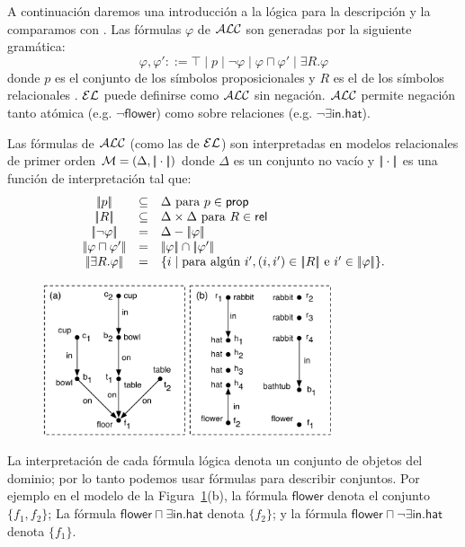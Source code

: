 A continuaci\'on daremos una introducci\'on a la l\'ogica para la descripci\'on \alc y la comparamos con \el. Las f\'ormulas $\varphi$ de $\mathcal{ALC}$ son generadas por la siguiente gram\'atica:
$$
\varphi,\varphi' ::= \top \mid p \mid \neg \varphi \mid \varphi \sqcap \varphi'
\mid \exists R. \varphi
$$
donde $p$ es el conjunto de los s\'imbolos proposicionales \prop y $R$ es el de los s\'imbolos relacionales \rel. $\mathcal{EL}$ puede definirse como $\mathcal{ALC}$ sin negaci\'on. $\mathcal{ALC}$ permite negaci\'on tanto at\'omica (e.g. $\neg \mathsf{flower}$) como sobre relaciones (e.g. $\neg \exists \mathsf{in}.\mathsf{hat}$).

Las f\'ormulas de $\mathcal{ALC}$ (como las de $\mathcal{EL}$) son interpretadas en modelos relacionales de primer orden $\mathcal{M} = (\Delta,|\!|\cdot|\!|)$ donde
$\Delta$ es un conjunto no vac\'io y $|\!|\cdot|\!|$ es una funci\'on de interpretaci\'on tal que:
$$
\begin{array}{ccl}
\interp{p} & \subseteq & \Delta  \mbox{ para $p \in \prop$}\\
\interp{R} & \subseteq & \Delta \times \Delta  \mbox{ para $R \in \rel$}\\
\interp{\neg \varphi} & = & \Delta - \interp{\varphi}\\
\interp{\varphi \sqcap \varphi'} & = & \interp{\varphi} \cap \interp{\varphi'}\\
\interp{\exists R.\varphi} & = & \{i \mid \mbox{para alg\'un } i', (i,i') \in \interp{R} \mbox{ e } i' \in \interp{\varphi} \}.\\
\end{array}
$$

\begin{figure}[t]
\begin{center}
\includegraphics[width=8.5cm]{pic-dale-haddock.pdf}
\caption{}
\label{fig:dale-haddock}
\end{center}
\end{figure}


La interpretaci\'on de cada f\'ormula l\'ogica denota un conjunto de objetos del dominio; por lo tanto podemos usar f\'ormulas para describir conjuntos. 
Por ejemplo en el modelo de la Figura~\ref{fig:dale-haddock}(b), la f\'ormula
$\mathsf{flower}$ denota el conjunto $\{f_1,f_2\}$; La f\'ormula
$\mathsf{flower} \sqcap \exists \mathsf{in}.\mathsf{hat}$ denota
$\{f_2\}$; y la f\'ormula $\mathsf{flower} \sqcap \neg
\exists \mathsf{in}.\mathsf{hat}$ denota $\{f_1\}$.\\

